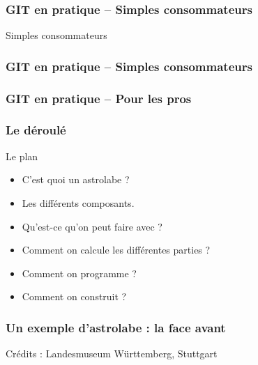\documentclass{beamer}
\begin{document}
\begin{frame}\frametitle{GIT en pratique -- Simples consommateurs }
Simples consommateurs
\begin{center}
\hglue -1cm 
\end{center}

\end{frame}

\begin{frame}\frametitle{GIT en pratique -- Simples consommateurs}
\begin{center}
\hglue -1cm 
\end{center}

   \end{frame}
   
   \begin{frame}\frametitle{GIT en pratique -- Pour les pros}
\begin{center}
\hglue -2cm 
\end{center}

   \end{frame}
   
   
   


\begin{frame}\frametitle{Le déroulé}
\begin{block}{Le plan}
\begin{itemize}
\item C'est quoi un astrolabe ?
\item Les différents composants. 
\item Qu'est-ce qu'on peut faire avec ? 
\item Comment on calcule les différentes parties ? 
\item Comment on programme ? 
\item Comment on construit ?

\end{itemize}
\end{block}

   \end{frame}
   
\begin{frame}\frametitle{Un exemple d'astrolabe : la face avant}
\begin{center}
\end{center}
{\hfill Crédits : Landesmuseum Württemberg, Stuttgart}



   \end{frame}
   
\end{document}
